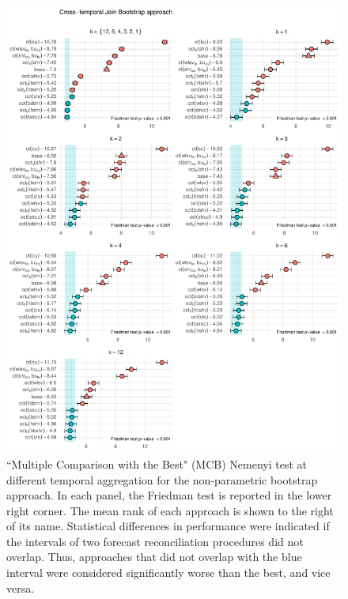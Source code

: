 \documentclass[a4paper,11pt]{article}
\theoremstyle{definition}
\begin{document}
\begin{figure}[p]
\centering
\includegraphics[width = 0.95\linewidth]{fig/VN525/ctjb_more.pdf}
\caption{“Multiple Comparison with the Best" (MCB) Nemenyi test at different temporal aggregation for the non-parametric bootstrap approach. In each panel, the Friedman test is reported in the lower right corner. The mean rank of each approach is shown to the right of its name. Statistical differences in performance were indicated if the intervals of two forecast reconciliation procedures did not overlap. Thus, approaches that did not overlap with the blue interval were considered significantly worse than the best, and vice versa.}
\label{fig:vnmcb_ctjb}
\end{figure}
\end{document}
